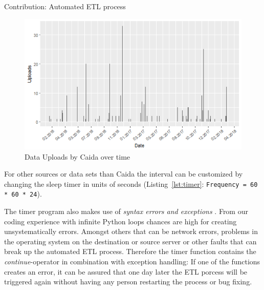 \documentclass[conference, 11pt]{IEEEtran}
\begin{document}
\begin{subsection}{Contribution: Automated ETL process}
\vspace{0.2cm}
\begin{figure}[htbp]
\centerline{\includegraphics[scale=0.5]{Graphics/uploadFrequency.png}}
\caption{Data Uploads by Caida over time}
\label{fig:UploadOverTime}
\end{figure}
\vspace{0.5cm}


 
For other sources or data sets than Caida the interval can be customized by changing the sleep timer in units of seconds (Listing~\ref{lst:timer}: \lstinline{Frequency = 60 * 60 * 24}).\linebreak

\vspace{0.3cm}
 \vspace{0.3cm}



The timer program also makes use of \textit{syntax errors and exceptions} \cite{PythonDocumentation}.
From our coding experience with infinite Python loops chances are high for creating unsystematically errors. Amongst others that can be network errors, problems in the operating system on the destination or source server or other faults that can break up the automated ETL process.
Therefore the timer function contains the \textit{continue}-operator in combination with exception handling: If one of the functions creates an error, it can be assured that one day later the ETL porcess will be triggered again without having any person restarting the process or bug fixing. \linebreak


\end{subsection}
\end{document}
